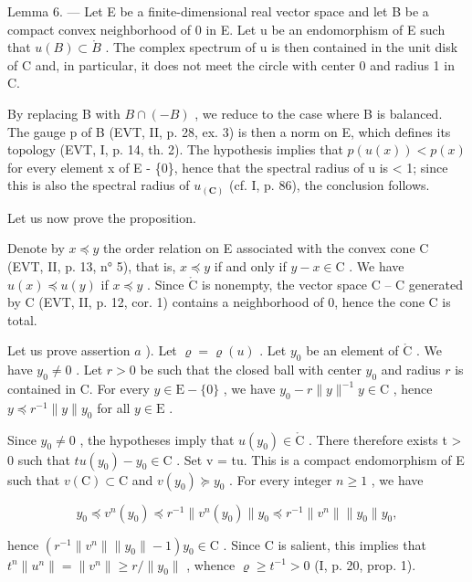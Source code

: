 Lemma 6. --- Let E be a finite-dimensional real vector space and let B be a compact convex neighborhood of 0 in E. Let u be an endomorphism of E such that \(u(B) \subset \mathring{B}\) . The complex spectrum of u is then contained in the unit disk of C and, in particular, it does not meet the circle with center 0 and radius 1 in C.

By replacing B with \(B \cap (-B)\) , we reduce to the case where B is balanced. The gauge p of B (EVT, II, p. 28, ex. 3) is then a norm on E, which defines its topology (EVT, I, p. 14, th. 2). The hypothesis implies that \(p(u(x)) < p(x)\) for every element x of E - \{0\}, hence that the spectral radius of u is \textless{} 1; since this is also the spectral radius of \(u_{(\mathbf{C})}\) (cf. I, p. 86), the conclusion follows.

Let us now prove the proposition.

Denote by \(x \preccurlyeq y\) the order relation on E associated with the convex cone C (EVT, II, p. 13, n° 5), that is, \(x \preccurlyeq y\) if and only if \(y - x \in \mathrm{C}\) . We have \(u(x) \preccurlyeq u(y)\) if \(x \preccurlyeq y\) . Since \(\mathring{\mathrm{C}}\) is nonempty, the vector space C -- C generated by C (EVT, II, p. 12, cor. 1) contains a neighborhood of 0, hence the cone C is total.

Let us prove assertion \(a\) ). Let \(\varrho = \varrho(u)\) . Let \(y_0\) be an element of \(\mathring{\mathrm{C}}\) . We have \(y_0 \neq 0\) . Let \(r > 0\) be such that the closed ball with center \(y_0\) and radius \(r\) is contained in C. For every \(y \in \mathrm{E} - \{0\}\) , we have \(y_0 - r \| y\|^{-1}y \in \mathrm{C}\) , hence \(y \preccurlyeq r^{-1}\| y\| y_0\) for all \(y \in \mathrm{E}\) .

Since \(y_{0} \neq 0\) , the hypotheses imply that \(u(y_{0}) \in \mathring{\mathrm{C}}\) . There therefore exists t \textgreater{} 0 such that \(tu(y_{0}) - y_{0} \in \mathrm{C}\) . Set v = tu. This is a compact endomorphism of E such that \(v(\mathrm{C}) \subset \mathrm{C}\) and \(v(y_{0}) \succcurlyeq y_{0}\) . For every integer \(n \geqslant 1\) , we have

\[
y _ {0} \preccurlyeq v ^ {n} (y _ {0}) \preccurlyeq r ^ {- 1} \| v ^ {n} (y _ {0}) \| y _ {0} \preccurlyeq r ^ {- 1} \| v ^ {n} \| \| y _ {0} \| y _ {0},
\]

hence \((r^{-1}\|v^{n}\|\|y_{0}\|-1)y_{0}\in\mathrm{C}\) . Since C is salient, this implies that \(t^{n}\|u^{n}\|=\|v^{n}\|\geqslant r/\|y_{0}\|\) , whence \(\varrho\geqslant t^{-1}>0\) (I, p. 20, prop. 1).

